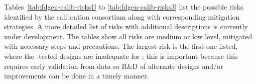 
Tables~\ref{tab:fdgen-calib-risks1} to \ref{tab:fdgen-calib-risks3} list the possible risks identified by the calibration consortium along with corresponding mitigation strategies. 
A more detailed list of risks with additional descriptions is currently under development. The tables show all risks are medium or low level, mitigated with necessary steps and precautions. The largest risk is the first one listed, where the -tested designs are inadequate for ; this is important because this requires early validation from  data so R\&D of alternate designs and/or improvements can be done in a timely manner.


